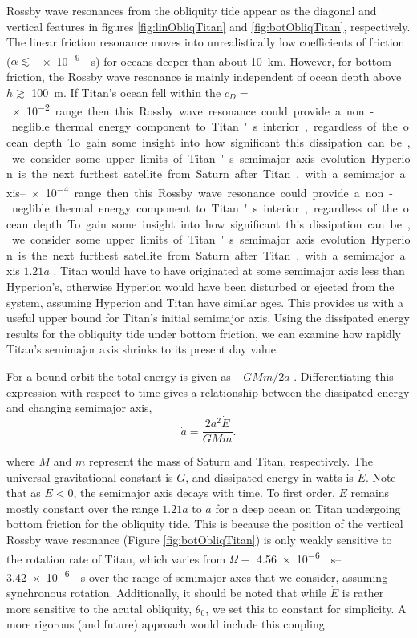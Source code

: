 Rossby wave resonances from the obliquity tide appear as the diagonal and vertical features in figures \ref{fig:linObliqTitan} and \ref{fig:botObliqTitan}, respectively. The linear friction resonance moves into unrealistically low coefficients of friction ($\alpha \lesssim$ \SI{e-9}{\per\second}) for oceans deeper than about \SI{10}{\kilo\metre}. However, for bottom friction, the Rossby wave resonance is mainly independent of ocean depth above $h \gtrsim$ \SI{100}{\metre}. If Titan's ocean fell within the $c_D =$ \SIrange{e-2}{e-4} range then this Rossby wave resonance could provide a non-neglible thermal energy component to Titan's interior, regardless of the ocean depth. To gain some insight into how significant this dissipation can be, we consider some upper limits of Titan's semimajor axis evolution.

Hyperion is the next furthest satellite from Saturn after Titan, with a semimajor axis  $1.21 a$ \citep{sears1995tidal}. Titan would have to have originated at some semimajor axis less than Hyperion's, otherwise Hyperion would have been disturbed or ejected from the system, assuming Hyperion and Titan have similar ages. This provides us with a useful upper bound for Titan's  initial semimajor axis. Using the dissipated energy results for the obliquity tide under bottom friction, we can examine how rapidly Titan's semimajor axis shrinks to its present day value.

For a bound orbit the total energy is given as $-GMm/2a$ \citep{goldreich1966q}. Differentiating this expression with respect to time gives a relationship between the dissipated energy and changing semimajor axis,
\begin{equation}
\dot{a} = \dfrac{2a^2 \dot{E}}{GM m}.
\label{eq:adot}
\end{equation}

where $M$ and $m$ represent the mass of Saturn and Titan, respectively. The universal gravitational constant is $G$, and dissipated energy in watts is $\dot{E}$. Note that as $\dot{E} < 0$, the semimajor axis decays with time. To first order, $\dot{E}$ remains mostly constant over the range $1.21 a$ to $a$ for a deep ocean on Titan undergoing bottom friction for the obliquity tide. This is because the position of the vertical Rossby wave resonance (Figure \ref{fig:botObliqTitan}) is only weakly sensitive to the rotation rate of Titan, which varies from $\Omega =$ \SIrange{4.56e-6}{3.42e-6}{\per\second} over the range of semimajor axes that we consider, assuming synchronous rotation. Additionally, it should be noted that while $\dot{E}$ is rather more sensitive to the acutal obliquity, $\theta_0$, we set this to constant for simplicity. A more rigorous (and future) approach would include this coupling.

